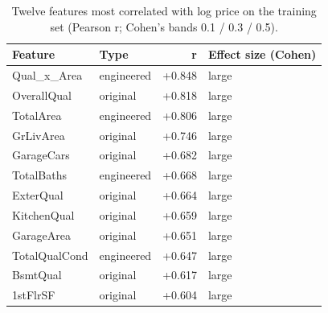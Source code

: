 \begin{table}[t]
\centering
\small
\begin{tabular}{llrl}
\toprule
Feature & Type & r & Effect size (Cohen) \\
\midrule
Qual\_x\_Area & engineered & +0.848 & large \\
OverallQual & original & +0.818 & large \\
TotalArea & engineered & +0.806 & large \\
GrLivArea & original & +0.746 & large \\
GarageCars & original & +0.682 & large \\
TotalBaths & engineered & +0.668 & large \\
ExterQual & original & +0.664 & large \\
KitchenQual & original & +0.659 & large \\
GarageArea & original & +0.651 & large \\
TotalQualCond & engineered & +0.647 & large \\
BsmtQual & original & +0.617 & large \\
1stFlrSF & original & +0.604 & large \\
\bottomrule
\end{tabular}
\caption{Twelve features most correlated with log price on the training set (Pearson r; Cohen's bands 0.1 / 0.3 / 0.5).}
\label{tab:eda_corr}
\end{table}
